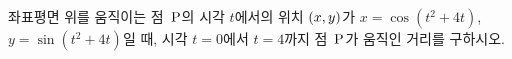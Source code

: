 좌표평면 위를 움직이는 점~$\mathrm{P}$의 시각 $t$에서의 위치 $(x{,}\mkern3mu\mathopen{}y)$가 $x=\cos(t^2+4t)$, $y=\sin(t^2+4t)$일 때, 시각 $t=0$에서 $t=4$까지 점~$\mathrm{P}$가 움직인 거리를 구하시오.
